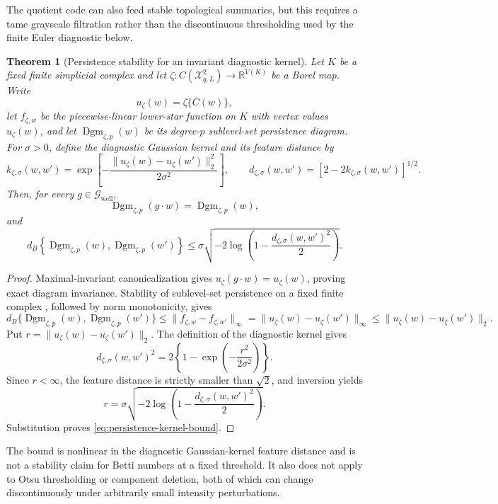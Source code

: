 \documentclass[11pt]{article}
\newtheorem{theorem}{Theorem}[section]
\theoremstyle{definition}
\theoremstyle{remark}
\newcommand{\cX}{\mathcal X}
\newcommand{\cG}{\mathcal G}
\newcommand{\bR}{\mathbb R}
\newcommand{\1}{\mathbf 1}
\begin{document}
The quotient code can also feed stable topological summaries, but this requires
a tame grayscale filtration rather than the discontinuous thresholding used by
the finite Euler diagnostic below.

\begin{theorem}[Persistence stability for an invariant diagnostic kernel]
\label{thm:persistence-kernel}
Let \(K\) be a fixed finite simplicial complex and let
\(\zeta:C(\cX_{q,L}^2)\to\bR^{V(K)}\) be a Borel map.  Write
\[
 u_\zeta(w)=\zeta\{C(w)\},
\]
let \(f_{\zeta,w}\) be the piecewise-linear lower-star function on \(K\) with
vertex values \(u_\zeta(w)\), and let \(\operatorname{Dgm}_{\zeta,p}(w)\) be
its degree-\(p\) sublevel-set persistence diagram.  For \(\sigma>0\), define
the diagnostic Gaussian kernel and its feature distance by
\[
 k_{\zeta,\sigma}(w,w')
 =\exp\!\left[-\frac{\|u_\zeta(w)-u_\zeta(w')\|_2^2}{2\sigma^2}\right],
 \qquad
 d_{\zeta,\sigma}(w,w')
 =\left[2-2k_{\zeta,\sigma}(w,w')\right]^{1/2}.
\]
Then, for every \(g\in\cG_{\mathrm{well}}\),
\[
 \operatorname{Dgm}_{\zeta,p}(g\cdot w)
 =\operatorname{Dgm}_{\zeta,p}(w),
\]
and
\begin{equation}\label{eq:persistence-kernel-bound}
 d_B\!\left\{
   \operatorname{Dgm}_{\zeta,p}(w),
   \operatorname{Dgm}_{\zeta,p}(w')
 \right\}
 \le
 \sigma
 \sqrt{-2\log\!\left(
   1-\frac{d_{\zeta,\sigma}(w,w')^2}{2}
 \right)}.
\end{equation}
\end{theorem}

\begin{proof}
Maximal-invariant canonicalization gives
\(u_\zeta(g\cdot w)=u_\zeta(w)\), proving exact diagram invariance.  Stability
of sublevel-set persistence on a fixed finite complex
\citep{cohensteiner2007stability}, followed by norm monotonicity, gives
\[
 d_B\{\operatorname{Dgm}_{\zeta,p}(w),
       \operatorname{Dgm}_{\zeta,p}(w')\}
 \le \|f_{\zeta,w}-f_{\zeta,w'}\|_\infty
 =\|u_\zeta(w)-u_\zeta(w')\|_\infty
 \le\|u_\zeta(w)-u_\zeta(w')\|_2.
\]
Put \(r=\|u_\zeta(w)-u_\zeta(w')\|_2\).  The definition of the diagnostic
kernel gives
\[
 d_{\zeta,\sigma}(w,w')^2
 =2\left\{1-\exp\left(-\frac{r^2}{2\sigma^2}\right)\right\}.
\]
Since \(r<\infty\), the feature distance is strictly smaller than \(\sqrt2\),
and inversion yields
\[
 r
 =\sigma\sqrt{-2\log\left(
   1-\frac{d_{\zeta,\sigma}(w,w')^2}{2}
 \right)}.
\]
Substitution proves \eqref{eq:persistence-kernel-bound}.
\end{proof}

The bound is nonlinear in the diagnostic Gaussian-kernel feature distance and
is not a stability claim for Betti numbers at a fixed threshold.  It also does not apply to Otsu
thresholding or component deletion, both of which can change discontinuously
under arbitrarily small intensity perturbations.
\end{document}
